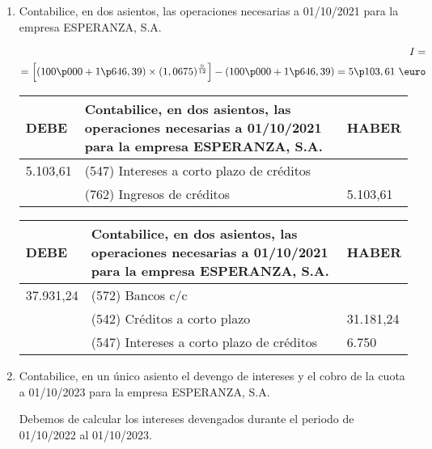 \begin{enumerate}[label=\textbf{\alph*})]
        \item Contabilice, en dos asientos, las operaciones necesarias a 01/10/2021 para la empresa ESPERANZA, S.A.
        
        \begin{align*}
            I = \\ = \left[(100\p000 + 1\p646,39) \times (1,0675)^{\frac{9}{12}}\right] - (100\p000 + 1\p646,39) = 5\p103,61 \text{ \euro}
        \end{align*}

        \begin{table}[H]
            \centering
            \begin{tabular}{|p{3cm}|p{6cm}|p{3cm}|}
            \hline
            \rowcolor{blue!30}
            \textbf{DEBE} & \textbf{Contabilice, en dos asientos, las operaciones necesarias a 01/10/2021 para la empresa ESPERANZA, S.A.} & \textbf{HABER} \\
            \hline
            5.103,61 & (547) Intereses a corto plazo de créditos & \\
            \hline
            & (762) Ingresos de créditos & 5.103,61 \\
            \hline
            \end{tabular}
        \end{table}

        \begin{table}[H]
            \centering
            \begin{tabular}{|p{3cm}|p{6cm}|p{3cm}|}
            \hline
            \rowcolor{blue!30}
            \textbf{DEBE} & \textbf{Contabilice, en dos asientos, las operaciones necesarias a 01/10/2021 para la empresa ESPERANZA, S.A.} & \textbf{HABER} \\
            \hline
            37.931,24 & (572) Bancos c/c & \\
            \hline
            & (542) Créditos a corto plazo & 31.181,24 \\
            \hline
            & (547) Intereses a corto plazo de créditos & 6.750 \\
            \hline
            \end{tabular}
        \end{table}

        \item Contabilice, en un único asiento el devengo de intereses y el cobro de la cuota a 01/10/2023 para la empresa ESPERANZA, S.A.
        
        Debemos de calcular los intereses devengados durante el periodo de 01/10/2022 al 01/10/2023.


\end{enumerate}
